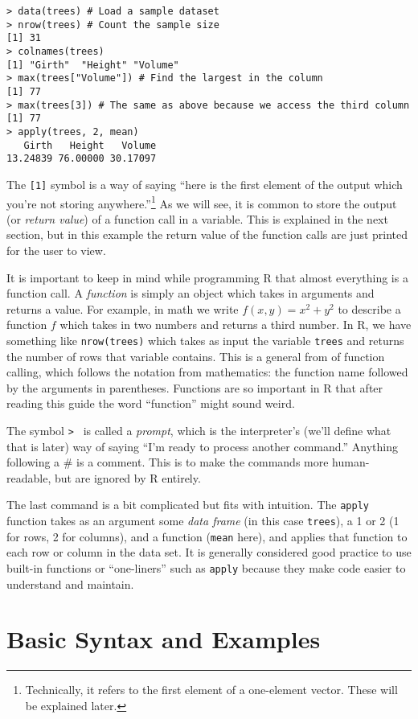 \documentclass[12pt]{article}
\begin{document}
\begin{verbatim}
> data(trees) # Load a sample dataset
> nrow(trees) # Count the sample size
[1] 31
> colnames(trees)
[1] "Girth"  "Height" "Volume"
> max(trees["Volume"]) # Find the largest in the column
[1] 77
> max(trees[3]) # The same as above because we access the third column
[1] 77
> apply(trees, 2, mean)
   Girth   Height   Volume 
13.24839 76.00000 30.17097
\end{verbatim}
The \verb|[1]| symbol is a way of saying ``here is the first element of the output which you're not storing anywhere.''\footnote{Technically, it refers to the first element of a one-element vector. These will be explained later.} As we will see, it is common to store the output (or \emph{return value}) of a function call in a variable. This is explained in the next section, but in this example the return value of the function calls are just printed for the user to view.

It is important to keep in mind while programming R that almost everything is a function call. A \emph{function} is simply an object which takes in arguments and returns a value. For example, in math we write $f(x, y) = x^2 + y^2$ to describe a function $f$ which takes in two numbers and returns a third number. In R, we have something like \verb|nrow(trees)| which takes as input the variable \verb|trees| and returns the number of rows that variable contains. This is a general from of function calling, which follows the notation from mathematics: the function name followed by the arguments in parentheses. Functions are so important in R that after reading this guide the word ``function'' might sound weird.

The symbol \verb|> | is called a \emph{prompt}, which is the interpreter's (we'll define what that is later) way of saying ``I'm ready to process another command.'' Anything following a \# is a comment. This is to make the commands more human-readable, but are ignored by R entirely.

The last command is a bit complicated but fits with intuition. The \verb|apply| function takes as an argument some \emph{data frame} (in this case \verb|trees|), a 1 or 2 (1 for rows, 2 for columns), and a function (\verb|mean| here), and applies that function to each row or column in the data set. It is generally considered good practice to use built-in functions or ``one-liners'' such as \verb|apply| because they make code easier to understand and maintain.

\section{Basic Syntax and Examples}
\end{document}
